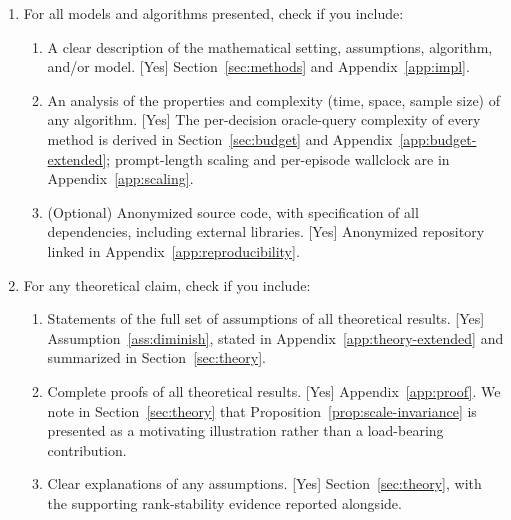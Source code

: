 \documentclass[twoside]{article}
\theoremstyle{plain}
\theoremstyle{definition}
\theoremstyle{remark}
\begin{document}
\begin{enumerate}

  \item For all models and algorithms presented, check if you include:
  \begin{enumerate}
    \item A clear description of the mathematical setting, assumptions, algorithm, and/or model. [Yes] Section~\ref{sec:methods} and Appendix~\ref{app:impl}.
    \item An analysis of the properties and complexity (time, space, sample size) of any algorithm. [Yes] The per-decision oracle-query complexity of every method is derived in Section~\ref{sec:budget} and Appendix~\ref{app:budget-extended}; prompt-length scaling and per-episode wallclock are in Appendix~\ref{app:scaling}.
    \item (Optional) Anonymized source code, with specification of all dependencies, including external libraries. [Yes] Anonymized repository linked in Appendix~\ref{app:reproducibility}.
  \end{enumerate}

  \item For any theoretical claim, check if you include:
  \begin{enumerate}
    \item Statements of the full set of assumptions of all theoretical results. [Yes] Assumption~\ref{ass:diminish}, stated in Appendix~\ref{app:theory-extended} and summarized in Section~\ref{sec:theory}.
    \item Complete proofs of all theoretical results. [Yes] Appendix~\ref{app:proof}. We note in Section~\ref{sec:theory} that Proposition~\ref{prop:scale-invariance} is presented as a motivating illustration rather than a load-bearing contribution.
    \item Clear explanations of any assumptions. [Yes] Section~\ref{sec:theory}, with the supporting rank-stability evidence reported alongside.
  \end{enumerate}


\end{enumerate}
\end{document}
